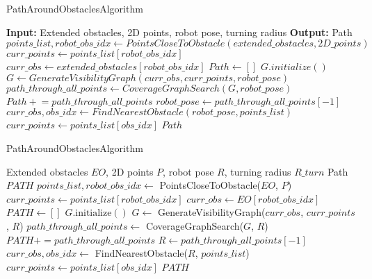 \begin{algorithm}[H]
    \caption{PathAroundObstaclesAlgorithm}
    \begin{algorithmic}[1]
        \Statex \textbf{Input:} Extended obstacles, 2D points, robot pose, turning radius
        \Statex \textbf{Output:} Path
        \newline
        \State $points\_list, robot\_obs\_idx \gets PointsCloseToObstacle(extended\_obstacles, 2D\_points)$
        \State $curr\_points \gets points\_list[robot\_obs\_idx]$    
        \State $curr\_obs \gets extended\_obstacles[robot\_obs\_idx]$
        \State $Path \gets []$
            \State $G.initialize()$
            \State $G \gets GenerateVisibilityGraph(curr\_obs, curr\_points, robot\_pose)$ 
            \State $path\_through\_all\_points \gets CoverageGraphSearch(G, robot\_pose)$
            \State $Path \mathrel{+}= path\_through\_all\_points$
            \State $robot\_pose \gets path\_through\_all\_points[-1]$
            \State $curr\_obs, obs\_idx \gets FindNearestObstacle(robot\_pose, points\_list)$
            \State $curr\_points \gets points\_list[obs\_idx]$
        \EndFor
        \State \Return $Path$
    \end{algorithmic}
\end{algorithm}


\begin{algorithm}[H]     
    \caption{PathAroundObstaclesAlgorithm}  
    \label{alg:path_around_obstacles_algorithm}
    \begin{algorithmic}[1]
    \Require Extended obstacles $EO$, 2D points $P$, robot pose $R$, turning radius $R\_turn$
    \Ensure Path $PATH$
    \State $points\_list, robot\_obs\_idx \leftarrow$ PointsCloseToObstacle($EO$, $P$)
    \State $curr\_points \leftarrow points\_list[robot\_obs\_idx]$    
    \State $curr\_obs \leftarrow EO[robot\_obs\_idx]$
    \State $PATH \leftarrow []$
        \State $G.\text{initialize}()$
        \State $G \leftarrow$ GenerateVisibilityGraph($curr\_obs$, $curr\_points$, $R$)
        \State $path\_through\_all\_points \leftarrow$ CoverageGraphSearch($G$, $R$)
        \State $PATH += path\_through\_all\_points$
        \State $R \leftarrow path\_through\_all\_points[-1]$
        \State $curr\_obs, obs\_idx \leftarrow$ FindNearestObstacle($R$, $points\_list$)
        \State $curr\_points \leftarrow points\_list[obs\_idx]$
    \EndFor
    \State \Return $PATH$
    \end{algorithmic}
    \end{algorithm}
    
